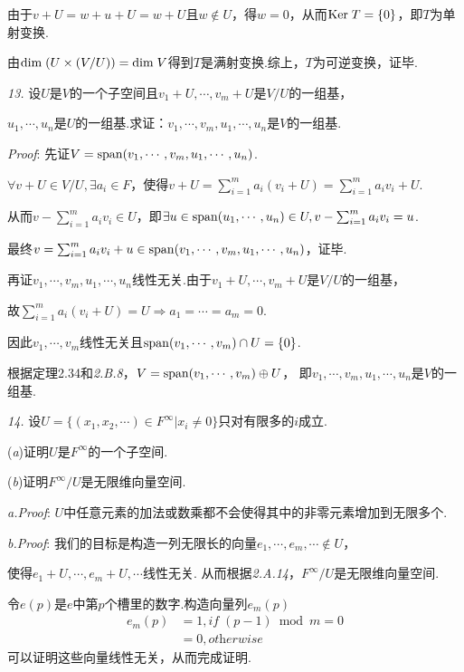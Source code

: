 由于\(v+U=w+u+U=w+U\)且\(w \notin U\)，得\(w=0\)，从而\(\mathrm{Ker \;} T=\{0\}\)，即\(T\)为单射变换.

由\(\mathrm{dim \;} (U \times (V/U))=\mathrm{dim \;} V\)得到\(T\)是满射变换.综上，\(T\)为可逆变换，证毕.

\newpage

\textit{13.}
设\(U\)是\(V\)的一个子空间且\(v_1+U,\cdots,v_m+U\)是\(V/U\)的一组基，

\(u_1,\cdots,u_n\)是\(U\)的一组基.求证：\(v_1,\cdots,v_m,u_1,\cdots,u_n\)是\(V\)的一组基.

\textit{Proof}:
先证\(V=\mathrm{span} (v_1,\cdots,v_m,u_1,\cdots,u_n)\).

\(\forall v+U \in V/U, \exists a_i \in F\)，使得\(v+U=\sum_{i=1}^m a_i(v_i+U)=\sum_{i=1}^m a_iv_i+U\).

从而\(v-\sum_{i=1}^m a_iv_i \in U\)，即\(\exists u \in \mathrm{span} (u_1,\cdots,u_n) \in U,v-\sum_{i=1}^m a_iv_i=u\).

最终\(v=\sum_{i=1}^m a_iv_i+u \in \mathrm{span} (v_1,\cdots,v_m,u_1,\cdots,u_n)\)，证毕.

再证\(v_1,\cdots,v_m,u_1,\cdots,u_n\)线性无关.由于\(v_1+U,\cdots,v_m+U\)是\(V/U\)的一组基，

故\(\sum_{i=1}^m a_i(v_i+U)=U \Rightarrow a_1=\cdots=a_m=0\).

因此\(v_1,\cdots,v_m\)线性无关且\(\mathrm{span} (v_1,\cdots,v_m) \cap U=\{0\}\).

根据定理2.34和\textit{2.B.8}，\(V=\mathrm{span} (v_1,\cdots,v_m) \oplus U\)，
即\(v_1,\cdots,v_m,u_1,\cdots,u_n\)是\(V\)的一组基.

\hspace*{\fill}

\textit{14.}
设\(U=\{(x_1,x_2,\cdots)\in F^\infty | x_i \ne 0\}\)只对有限多的\(i\)成立.

(\textit{a})证明\(U\)是\(F^\infty\)的一个子空间.

(\textit{b})证明\(F^\infty /U\)是无限维向量空间.

\textit{a.Proof}:
\(U\)中任意元素的加法或数乘都不会使得其中的非零元素增加到无限多个.

\textit{b.Proof}:
我们的目标是构造一列无限长的向量\(e_1,\cdots,e_m,\cdots \notin U\)，

使得\(e_1+U,\cdots,e_m+U,\cdots\)线性无关.
从而根据\textit{2.A.14}，\(F^\infty /U\)是无限维向量空间.

令\(e(p)\)是\(e\)中第\(p\)个槽里的数字.构造向量列\(e_m(p)\)
    \begin{align*}
        e_m(p) &=1,\textit{if} \; (p-1) \bmod m=0 \\
            &=0,\textit{otherwise}
    \end{align*}
可以证明这些向量线性无关，从而完成证明.

